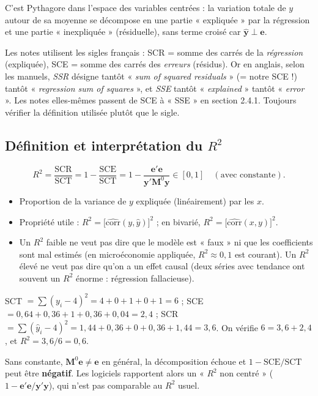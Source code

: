\documentclass[11pt,a4paper]{article}
\newcommand{\vy}{\mathbf{y}}
\newcommand{\ve}{\mathbf{e}}
\newcommand{\Mm}{\mathbf{M}}
\begin{document}
\begin{intuition}
C'est Pythagore dans l'espace des variables centrées : la variation totale de $y$ autour de sa moyenne se décompose en une partie « expliquée » par la régression et une partie « inexpliquée » (résiduelle), sans terme croisé car $\hat{\vy}\perp\ve$.
\end{intuition}

\begin{attention}[title={Attention aux sigles !}]
Les notes utilisent les sigles français : SCR = somme des carrés de la \emph{régression} (expliquée), SCE = somme des carrés des \emph{erreurs} (résidus). Or en anglais, selon les manuels, \emph{SSR} désigne tantôt « \emph{sum of squared residuals} » (= notre SCE !) tantôt « \emph{regression sum of squares} », et \emph{SSE} tantôt « \emph{explained} » tantôt « \emph{error} ». Les notes elles-mêmes passent de SCE à « SSE » en section 2.4.1. Toujours vérifier la définition utilisée plutôt que le sigle.
\end{attention}

\subsection{Définition et interprétation du $R^2$}
\[
R^2=\frac{\text{SCR}}{\text{SCT}}=1-\frac{\text{SCE}}{\text{SCT}}=1-\frac{\ve'\ve}{\vy'\Mm^0\vy}\in[0,1]\quad(\text{avec constante}).
\]
\begin{itemize}
\item Proportion de la variance de $y$ expliquée (linéairement) par les $x$.
\item Propriété utile : $R^2=\big[\widehat{\text{corr}}(y,\hat y)\big]^2$ ; en bivarié, $R^2=\big[\widehat{\text{corr}}(x,y)\big]^2$.
\item Un $R^2$ faible ne veut pas dire que le modèle est « faux » ni que les coefficients sont mal estimés (en microéconomie appliquée, $R^2\approx0{,}1$ est courant). Un $R^2$ élevé ne veut pas dire qu'on a un effet causal (deux séries avec tendance ont souvent un $R^2$ énorme : régression fallacieuse).
\end{itemize}

\begin{exemple}
SCT $=\sum(y_i-4)^2=4+0+1+0+1=6$ ; SCE $=0{,}64+0{,}36+1+0{,}36+0{,}04=2{,}4$ ; SCR $=\sum(\hat y_i-4)^2=1{,}44+0{,}36+0+0{,}36+1{,}44=3{,}6$. On vérifie $6=3{,}6+2{,}4$ \checkmark, et $R^2=3{,}6/6=0{,}6$.
\end{exemple}

\begin{attention}
Sans constante, $\Mm^0\ve\ne\ve$ en général, la décomposition échoue et $1-\text{SCE}/\text{SCT}$ peut être \textbf{négatif}. Les logiciels rapportent alors un « $R^2$ non centré » ($1-\ve'\ve/\vy'\vy$), qui n'est pas comparable au $R^2$ usuel.
\end{attention}
\end{document}

